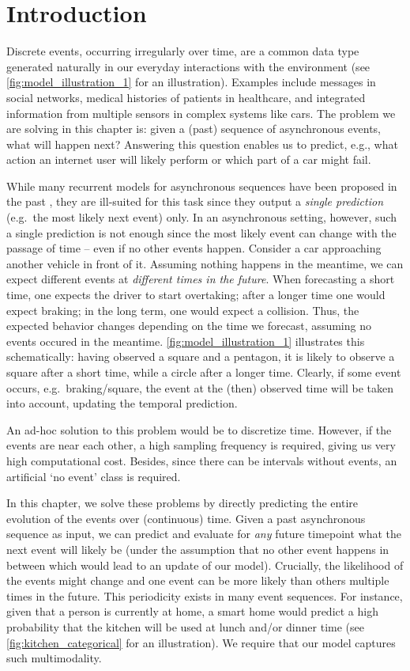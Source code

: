 \section{Introduction}
\label{sec:introduction_010}

Discrete events, occurring irregularly over time, are a common data type generated naturally in our everyday interactions with the environment (see \cref{fig:model_illustration_1} for an illustration). Examples include messages in social networks, medical histories of patients in healthcare, and integrated information from multiple sensors in complex systems like cars. The problem we are solving in this chapter is: given a (past) sequence of asynchronous events, what will happen next? Answering this question enables us to predict, e.g., what action an internet user will likely perform or which part of a car might fail.

While many recurrent models for asynchronous sequences have been proposed in the past \cite{PhasedLstm, RMTPP}, they are ill-suited for this task since they output a \textit{single prediction} (e.g.\ the most likely next event) only. In an asynchronous setting, however, such a single prediction is not enough since the most likely event can change with the passage of time -- even if no other events happen. Consider a car approaching another vehicle in front of it. Assuming nothing happens in the meantime, we can expect different events at \textit{different times in the future}. When forecasting a short time, one expects the driver to start overtaking; after a longer time one would expect braking; in the long term, one would expect a collision. Thus, the expected behavior changes depending on the time we forecast, assuming no events occured in the meantime. \cref{fig:model_illustration_1} illustrates this schematically: having observed a square and a pentagon, it is likely to observe a square after a short time, while a circle after a longer time. Clearly, if some event occurs, e.g.\ braking/square, the event at the (then) observed time will be taken into account, updating the temporal prediction.

An ad-hoc solution to this problem would be to discretize time. However, if the events are near each other, a high sampling frequency is required, giving us very high computational cost. Besides, since there can be intervals without events, an artificial `no event' class is required.

In this chapter, we solve these problems by directly predicting the entire evolution of the events over (continuous) time. Given a past asynchronous sequence as input, we can predict and evaluate for \textit{any} future timepoint what the next event will likely be (under the assumption that no other event happens in between which would lead to an update of our model). Crucially, the likelihood of the events might change and one event can be more likely than others multiple times in the future. This periodicity exists in many event sequences. For instance, given that a person is currently at home, a smart home would predict a high probability that the kitchen will be used at lunch and/or dinner time (see \cref{fig:kitchen_categorical} for an illustration). We require that our model captures such multimodality.

